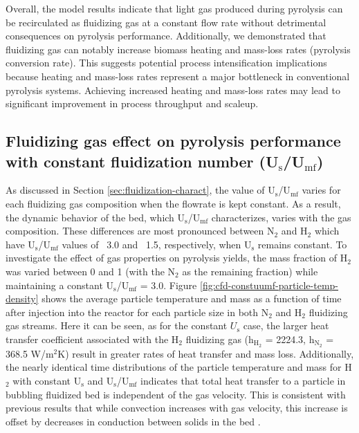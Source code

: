 \documentclass{article}
\begin{document}
Overall, the model results indicate that light gas produced during pyrolysis can be recirculated as fluidizing gas at a constant flow rate without detrimental consequences on pyrolysis performance. Additionally, we demonstrated that fluidizing gas can notably increase biomass heating and mass-loss rates (pyrolysis conversion rate). This suggests potential process intensification implications because heating and mass-loss rates represent a major bottleneck in conventional pyrolysis systems. Achieving increased heating and mass-loss rates may lead to significant improvement in process throughput and scaleup.

\subsection{Fluidizing gas effect on pyrolysis performance with constant fluidization number (\texorpdfstring{U$_\text{s}$/U$_\text{mf}$}{Us/Umf})}

As discussed in Section \ref{sec:fluidization-charact}, the value of U$_\text{s}$/U$_\text{mf}$ varies for each fluidizing gas composition when the flowrate is kept constant. As a result, the dynamic behavior of the bed, which U$_\text{s}$/U$_\text{mf}$ characterizes, varies with the gas composition. These differences are most pronounced between N$_2$ and H$_2$ which have U$_\text{s}$/U$_\text{mf}$ values of ~3.0 and ~1.5, respectively, when U$_\text{s}$ remains constant. To investigate the effect of gas properties on pyrolysis yields, the mass fraction of H$_2$ was varied between 0 and 1 (with the N$_2$ as the remaining fraction) while maintaining a constant U$_\text{s}$/U$_\text{mf}$ = 3.0. Figure \ref{fig:cfd-constuumf-particle-temp-density} shows the average particle temperature and mass as a function of time after injection into the reactor for each particle size in both N$_{2}$ and H$_{2}$ fluidizing gas streams. Here it can be seen, as for the constant $U_\text{s}$ case, the larger heat transfer coefficient associated with the H$_2$ fluidizing gas (h$_{\text{H}_2}$ = 2224.3, h$_{\text{N}_2}$ = 368.5 W/m$^2$K) result in greater rates of heat transfer and mass loss. Additionally, the nearly identical time distributions of the particle temperature and mass for H$_2$ with constant U$_\text{s}$ and U$_\text{s}$/U$_\text{mf}$ indicates that total heat transfer to a particle in bubbling fluidized bed is independent of the gas velocity. This is consistent with previous results that while convection increases with gas velocity, this increase is offset by decreases in conduction between solids in the bed \cite{Collier-2004,zhou2009particle}.
\end{document}
